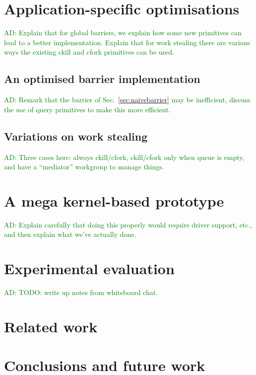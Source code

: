 \documentclass[nocopyrightspace]{sigplanconf-pldi16}
\newcommand{\ADComment}[1]{\textcolor{green}{AD: #1}}
\newcommand{\mysec}{Sec.~}
\begin{document}
\section{Application-specific optimisations}

\ADComment{Explain that for global barriers, we explain how some new
  primitives can lead to a better implementation.  Explain that for
  work stealing there are various ways the existing ckill and cfork
  primitives can be used.}

\subsection{An optimised barrier implementation}

\ADComment{Remark that the barrier of \mysec\ref{sec:naivebarrier} may
  be inefficient, discuss the use of query primitives to make this
  more efficient.}

\subsection{Variations on work stealing}

\ADComment{Three cases here: always ckill/cfork, ckill/cfork only when
  queue is empty, and have a ``mediator'' workgroup to manage things.}


\section{A mega kernel-based prototype}

\ADComment{Explain carefully that doing this properly would require
  driver support, etc., and then explain what we've actually done.}


\section{Experimental evaluation}

\ADComment{TODO: write up notes from whiteboard chat.}


\section{Related work}

\section{Conclusions and future work}
\end{document}

